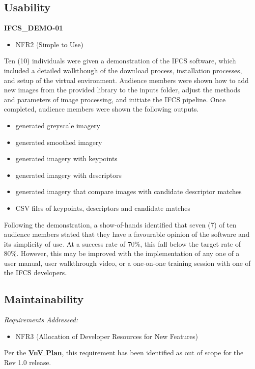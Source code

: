 \documentclass[12pt, titlepage]{article}
\begin{document}
\subsection{Usability}
\textbf{IFCS\_DEMO-01}\\
\begin{itemize}
  \item NFR2 (Simple to Use)
  \end{itemize}
Ten (10) individuals were given a demonstration of the IFCS software, which included a detailed walkthough of the download process, installation processes, and setup of the virtual environment. Audience members were shown how to add new images from the provided library to the inputs folder, adjust the methods and parameters of image processing, and initiate the IFCS pipeline. Once completed, audience members were shown the following outputs.
\begin{itemize}
  \item generated greyscale imagery
  \item generated smoothed imagery
  \item generated imagery with keypoints
  \item generated imagery with descriptors
  \item generated imagery that compare images with candidate descriptor matches
  \item CSV files of keypoints, descriptors and candidate matches
\end{itemize}
Following the demonstration, a show-of-hands identified that seven (7) of ten audience members stated that they have a favourable opinion of the software and its simplicity of use. At a success rate of 70\%, this fall below the target rate of 80\%. However, this may be improved with the implementation of any one of a user manual, user walkthrough video, or a one-on-one training session with one of the IFCS developers.

\subsection{Maintainability}
\textit{Requirements Addressed:} 
\begin{itemize}
\item NFR3 (Allocation of Developer Resources for New Features)
\end{itemize}
Per the \href{https://github.com/KiranSingh15/CAS-741-Image-Correspondences/blob/main/docs/VnVPlan/VnVPlan.pdf}{\textbf{VnV Plan}}, this requirement has been identified as out of scope for the Rev 1.0 release.
		
\end{document}
